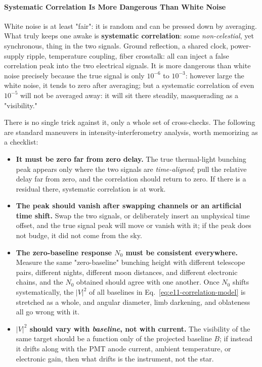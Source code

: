 \paragraph{Systematic Correlation Is More Dangerous Than White Noise}
\label{sec:e11-systematics}

White noise is at least "fair": it is random and can be pressed down by averaging. What truly keeps one awake is \textbf{systematic correlation}: some \emph{non-celestial}, yet synchronous, thing in the two signals. Ground reflection, a shared clock, power-supply ripple, temperature coupling, fiber crosstalk: all can inject a false correlation peak into the two electrical signals. It is more dangerous than white noise precisely because the true signal is only \(10^{-6}\) to \(10^{-3}\): however large the white noise, it tends to zero after averaging; but a systematic correlation of even \(10^{-5}\) will not be averaged away: it will sit there steadily, masquerading as a "visibility."

There is no single trick against it, only a whole set of cross-checks. The following are standard maneuvers in intensity-interferometry analysis, worth memorizing as a checklist:

\begin{itemize}
  \item \textbf{It must be zero far from zero delay.} The true thermal-light bunching peak appears only where the two signals are \emph{time-aligned}; pull the relative delay far from zero, and the correlation should return to zero. If there is a residual there, systematic correlation is at work.
  \item \textbf{The peak should vanish after swapping channels or an artificial time shift.} Swap the two signals, or deliberately insert an unphysical time offset, and the true signal peak will move or vanish with it; if the peak does not budge, it did not come from the sky.
  \item \textbf{The zero-baseline response \(N_0\) must be consistent everywhere.} Measure the same "zero-baseline" bunching height with different telescope pairs, different nights, different moon distances, and different electronic chains, and the \(N_0\) obtained should agree with one another. Once \(N_0\) shifts systematically, the \(|V|^2\) of all baselines in Eq.~\eqref{eq:e11-correlation-model} is stretched as a whole, and angular diameter, limb darkening, and oblateness all go wrong with it.
  \item \textbf{\(|V|^2\) should vary with \emph{baseline}, not with current.} The visibility of the same target should be a function only of the projected baseline \(B\); if instead it drifts along with the PMT anode current, ambient temperature, or electronic gain, then what drifts is the instrument, not the star.
\end{itemize}

